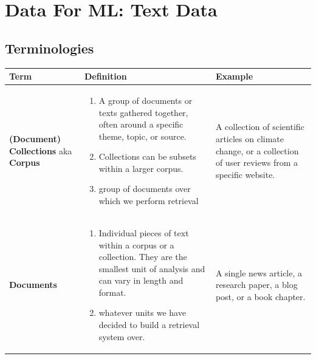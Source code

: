 \chapter{Data For ML: Text Data}

\section{Terminologies \cite{nlp-1, chatgpt, ir-1}}
\begin{table}[h!]
    \centering
    \begin{tabular}{| m{2cm} | m{6cm} | m{6cm} |}
        \hline
        \textbf{Term} & \textbf{Definition} & \textbf{Example} \\
        \hline
        \textbf{(Document) Collections} aka \textbf{Corpus} & \vspace{0.2cm}\begin{enumerate}
            \item A group of documents or texts gathered together, often around a specific theme, topic, or source. 
            
            \item Collections can be subsets within a larger corpus.

            \item group of documents over which we perform retrieval \cite{ir-1}
        \end{enumerate} & A collection of scientific articles on climate change, or a collection of user reviews from a specific website. \\
        \hline
        
        \textbf{Documents} & \vspace{0.3cm}\begin{enumerate}
            \item Individual pieces of text within a corpus or a collection. They are the smallest unit of analysis and can vary in length and format.
            
            \item whatever units we have decided to build a retrieval system over. \cite{ir-1}
        \end{enumerate} & A single news article, a research paper, a blog post, or a book chapter. \\
        \hline
        
    \end{tabular}
\end{table}


